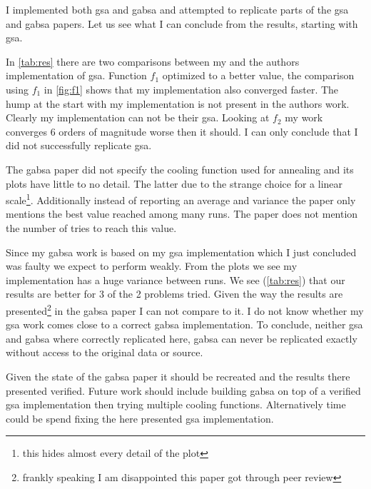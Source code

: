 I implemented both \ac{gsa} and \ac{gabsa} and attempted to replicate parts of the \ac{gsa}\cite{GSA} and \ac{gabsa}\cite{GABSA} papers. Let us see what I can conclude from the results, starting with \ac{gsa}.

In \cref{tab:res} there are two comparisons between my and the authors implementation of \ac{gsa}. Function $f_1$ optimized to a better value, the comparison using $f_1$ in \cref{fig:f1} shows that my implementation also converged faster. The hump at the start with my implementation is not present in the authors work. Clearly my implementation can not be their \ac{gsa}. Looking at $f_2$ my work converges 6 orders of magnitude worse then it should. I can only conclude that I did not successfully replicate \ac{gsa}.

The \ac{gabsa} paper \cite{GABSA} did not specify the cooling function used for annealing and its plots have little to no detail. The latter due to the strange choice for a linear scale\footnote{this hides almost every detail of the plot}. Additionally instead of reporting an average and variance the paper only mentions the best value reached among many runs. The paper does not mention the number of tries to reach this value.

Since my \ac{gabsa} work is based on my \ac{gsa} implementation which I just concluded was faulty we expect to perform weakly. From the plots we see my implementation has a huge variance between runs. We see (\cref{tab:res}) that our results are better for 3 of the 2 problems tried. Given the way the results are presented\footnote{frankly speaking I am disappointed this paper got through peer review} in the \ac{gabsa} paper I can not compare to it. I do not know whether my \ac{gsa} work comes close to a correct \ac{gabsa} implementation.
%
To conclude, neither \ac{gsa} and \ac{gabsa} where correctly replicated here, \ac{gabsa} can never be replicated exactly without access to the original data or source.

Given the state of the \ac{gabsa} paper\cite{GABSA} it should be recreated and the results there presented verified. Future work should include building \ac{gabsa} on top of a verified \ac{gsa} implementation then trying multiple cooling functions. Alternatively time could be spend fixing the here presented \ac{gsa} implementation.
